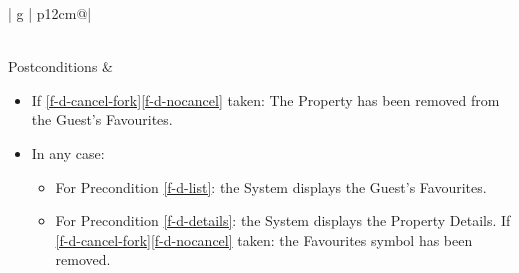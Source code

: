 \begin{table}[H]
\begin{tabular}{| g | p{12cm}@\qquad |}
\begin{enumerate}
\begin{enumerate}
            \end{enumerate}
        \end{enumerate}
        \\ \hline
        Postconditions &
        \begin{itemize}
            \item If \ref{f-d-cancel-fork}\ref{f-d-nocancel} taken: The Property has been removed from the Guest's Favourites.
            \item In any case:
            \begin{itemize}
                \item For Precondition \ref{f-d-list}: the System displays the Guest's Favourites.
                \item For Precondition \ref{f-d-details}: the System displays the Property Details. If \ref{f-d-cancel-fork}\ref{f-d-nocancel} taken: the Favourites symbol has been removed.
            \end{itemize}
        \end{itemize}
         \\ \hline
    \end{tabular}
    \caption{Use Case F-D: Remove from Favourites}
    \label{use_case_f-d}
  \end{table}